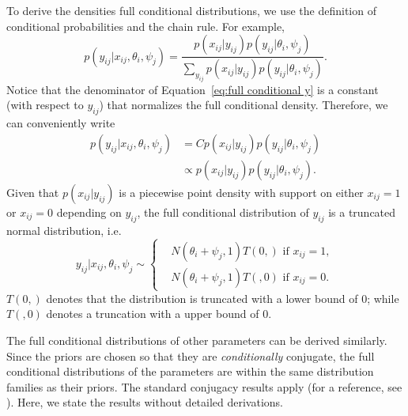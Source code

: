 \documentclass[floatsintext, man]{apa7}
\begin{document}
To derive the densities full conditional distributions, we use the definition of
conditional probabilities and the chain rule. For example,
\begin{equation}
\label{eq:full conditional y}
  p(y_{ij}|x_{ij}, \theta_i, \psi_j) = \frac{p(x_{ij}|y_{ij})p(y_{ij}|\theta_i,
  \psi_j)}{\sum_{y_{ij}}p(x_{ij}|y_{ij})p(y_{ij}|\theta_i, \psi_j)}.
\end{equation}
Notice that the denominator of Equation~\ref{eq:full conditional y} is a
constant (with respect to $y_{ij}$) that normalizes the full conditional
density. Therefore, we can conveniently write
\begin{align*}
  p(y_{ij}|x_{ij}, \theta_i, \psi_j) &= C p(x_{ij}|y_{ij})p(y_
  {ij}|\theta_i, \psi_j)\\
  & \propto p(x_{ij}|y_{ij})p(y_{ij}|\theta_i, \psi_j).
\end{align*}
Given that $p(x_{ij}|y_{ij})$ is a piecewise point density with support on
either $x_{ij} = 1$ or $x_{ij} = 0$ depending on $y_{ij}$, the full conditional
distribution of $y_{ij}$ is a truncated normal distribution, i.e.
\[
  y_{ij}|x_{ij},\theta_i,\psi_j \sim \begin{cases}
  &N(\theta_i + \psi_j, 1)T(0,) \text{ if } x_{ij} = 1,\\
  &N(\theta_i + \psi_j, 1)T(,0) \text{ if } x_{ij} = 0.
  \end{cases}
\]
$T(0,)$ denotes that the distribution is truncated with a lower bound of 0;
while $T(,0)$ denotes a truncation with a upper bound of 0.

The full conditional distributions of other parameters can be derived similarly.
Since the priors are chosen so that they are \textit{conditionally} conjugate,
the full conditional distributions of the parameters are within the same
distribution families as their priors. The standard conjugacy results apply (for
a reference, see \cite{gelman_bayesian_2013}). Here, we state the results without
detailed derivations.
\end{document}

